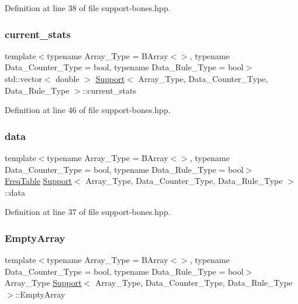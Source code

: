 Definition at line 38 of file support-\/bones.\+hpp.

\mbox{\label{class_support_aec5901ad006e5ebe29c7605e7bcc702c}} 
\subsubsection{\texorpdfstring{current\+\_\+stats}{current\_stats}}
{\footnotesize\ttfamily template$<$typename Array\+\_\+\+Type = B\+Array$<$$>$, typename Data\+\_\+\+Counter\+\_\+\+Type = bool, typename Data\+\_\+\+Rule\+\_\+\+Type = bool$>$ \\
std\+::vector$<$ double $>$ \hyperlink{class_support}{Support}$<$ Array\+\_\+\+Type, Data\+\_\+\+Counter\+\_\+\+Type, Data\+\_\+\+Rule\+\_\+\+Type $>$\+::current\+\_\+stats}



Definition at line 46 of file support-\/bones.\+hpp.

\mbox{\label{class_support_a1b7bc59cfcdd9bbdc164c6265917b030}} 
\subsubsection{\texorpdfstring{data}{data}}
{\footnotesize\ttfamily template$<$typename Array\+\_\+\+Type = B\+Array$<$$>$, typename Data\+\_\+\+Counter\+\_\+\+Type = bool, typename Data\+\_\+\+Rule\+\_\+\+Type = bool$>$ \\
\hyperlink{class_freq_table}{Freq\+Table} \hyperlink{class_support}{Support}$<$ Array\+\_\+\+Type, Data\+\_\+\+Counter\+\_\+\+Type, Data\+\_\+\+Rule\+\_\+\+Type $>$\+::data}



Definition at line 37 of file support-\/bones.\+hpp.

\mbox{\label{class_support_a3ec1b46e245b89ae007601caaf4958c9}} 
\subsubsection{\texorpdfstring{Empty\+Array}{EmptyArray}}
{\footnotesize\ttfamily template$<$typename Array\+\_\+\+Type = B\+Array$<$$>$, typename Data\+\_\+\+Counter\+\_\+\+Type = bool, typename Data\+\_\+\+Rule\+\_\+\+Type = bool$>$ \\
Array\+\_\+\+Type \hyperlink{class_support}{Support}$<$ Array\+\_\+\+Type, Data\+\_\+\+Counter\+\_\+\+Type, Data\+\_\+\+Rule\+\_\+\+Type $>$\+::Empty\+Array}



